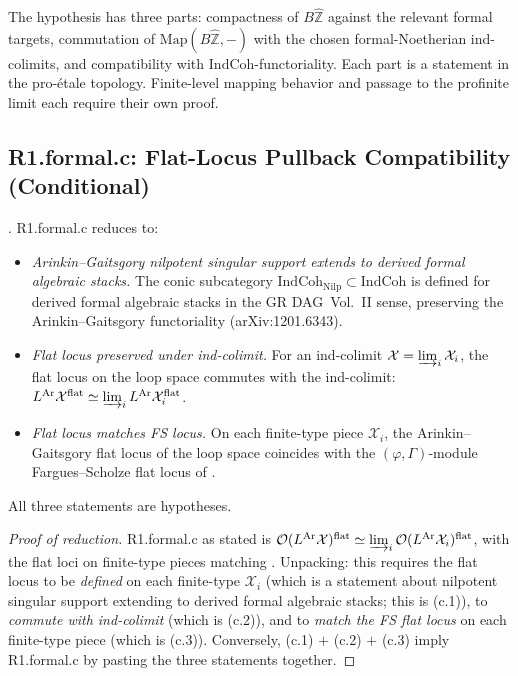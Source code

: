 \begin{remark}
\label{v4-arith:bzn-sub:rem:R1-formal-b-domain-estimate}
The hypothesis has three parts: compactness of
\(B\widehat{\mathbb{Z}}\) against the relevant formal targets,
commutation of \(\mathrm{Map}(B\widehat{\mathbb{Z}},-)\) with the
chosen formal-Noetherian ind-colimits, and compatibility with
\(\mathrm{IndCoh}\)-functoriality.  Each part is a statement in the
pro-\'etale topology. Finite-level mapping behavior and passage to the
profinite limit each require their own proof.
\end{remark}

\subsection{R1.formal.c: Flat-Locus Pullback Compatibility (Conditional)}

\begin{proposition}
\label{v4-arith:bzn-sub:prop:R1-formal-c-domain}
\ClaimStatusProvedHere. R1.formal.c reduces to:
\begin{itemize}
\item[\textbf{(c.1)}] \emph{Arinkin--Gaitsgory nilpotent singular
support extends to derived formal algebraic stacks.} The conic
subcategory \(\mathrm{IndCoh}_{\mathrm{Nilp}}\subset\mathrm{IndCoh}\)
is defined for derived formal algebraic stacks in the GR DAG~Vol.~II
sense, preserving the Arinkin--Gaitsgory
functoriality (arXiv:1201.6343).
\item[\textbf{(c.2)}] \emph{Flat locus preserved under ind-colimit.}
For an ind-colimit \(\mathcal{X}=\varinjlim_{i}\mathcal{X}_{i}\),
the flat locus on the loop space commutes with the ind-colimit:
\(L^{\mathrm{Ar}}\mathcal{X}^{\mathrm{flat}}\simeq\varinjlim_{i}L^{\mathrm{Ar}}\mathcal{X}_{i}^{\mathrm{flat}}\).
\item[\textbf{(c.3)}] \emph{Flat locus matches FS locus.} On each
finite-type piece \(\mathcal{X}_{i}\), the
Arinkin--Gaitsgory flat locus of the loop space coincides with the
\((\varphi,\Gamma)\)-module Fargues--Scholze flat locus of
.
\end{itemize}
All three statements are hypotheses.
\end{proposition}

\begin{proof}[Proof of reduction]
R1.formal.c as stated is
\(\mathcal{O}(L^{\mathrm{Ar}}\mathcal{X})^{\mathrm{flat}}\simeq\varinjlim_{i}\mathcal{O}(L^{\mathrm{Ar}}\mathcal{X}_{i})^{\mathrm{flat}}\),
with the flat loci on finite-type pieces matching
. Unpacking: this requires the
flat locus to be \emph{defined} on each finite-type \(\mathcal{X}_{i}\)
(which is a statement about nilpotent singular support extending to
derived formal algebraic stacks; this is (c.1)), to \emph{commute
with ind-colimit} (which is (c.2)), and to \emph{match the FS flat
locus} on each finite-type piece (which is (c.3)). Conversely, (c.1)
\(+\) (c.2) \(+\) (c.3) imply R1.formal.c by pasting the three
statements together.
\end{proof}

